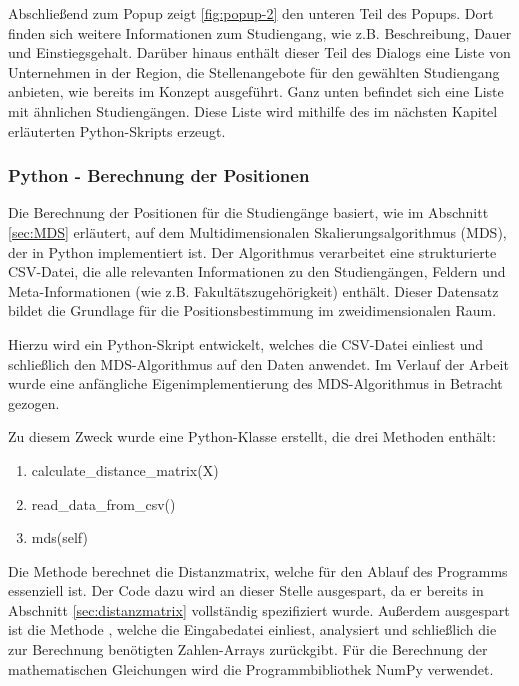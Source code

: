 Abschließend zum Popup zeigt \autoref{fig:popup-2} den unteren Teil des Popups. Dort finden sich weitere Informationen zum Studiengang, wie z.B. Beschreibung, Dauer und Einstiegsgehalt. Darüber hinaus enthält dieser Teil des Dialogs eine Liste von Unternehmen in der Region, die Stellenangebote für den gewählten Studiengang anbieten, wie bereits im Konzept ausgeführt. Ganz unten befindet sich eine Liste mit ähnlichen Studiengängen. Diese Liste wird mithilfe des im nächsten Kapitel erläuterten Python-Skripts erzeugt.

\subsubsection{Python - Berechnung der Positionen}
Die Berechnung der Positionen für die Studiengänge basiert, wie im Abschnitt
\ref{sec:MDS} erläutert, auf dem Multidimensionalen Skalierungsalgorithmus
(MDS), der in Python implementiert ist. Der Algorithmus verarbeitet eine
strukturierte CSV-Datei, die alle relevanten Informationen zu den Studiengängen,
Feldern und Meta-Informationen (wie z.B. Fakultätszugehörigkeit) enthält. Dieser
Datensatz bildet die Grundlage für die Positionsbestimmung im zweidimensionalen
Raum.

Hierzu wird ein Python-Skript entwickelt, welches die CSV-Datei einliest und
schließlich den MDS-Algorithmus auf den Daten anwendet. Im Verlauf der
Arbeit wurde eine anfängliche Eigenimplementierung des MDS-Algorithmus in
Betracht gezogen.

\noindent
Zu diesem Zweck wurde eine Python-Klasse erstellt, die drei Methoden enthält:
\begin{enumerate}
    \item calculate\_distance\_matrix(X)
    \item read\_data\_from\_csv()
    \item mds(self)
\end{enumerate}

Die Methode  berechnet die Distanzmatrix,
welche für den Ablauf des Programms essenziell ist. Der Code dazu wird an
dieser Stelle ausgespart, da er bereits in Abschnitt \ref{sec:distanzmatrix}
vollständig spezifiziert wurde. Außerdem ausgespart ist die Methode
, welche die Eingabedatei einliest, analysiert und
schließlich die zur Berechnung benötigten Zahlen-Arrays zurückgibt. Für die Berechnung der mathematischen Gleichungen wird die Programmbibliothek NumPy verwendet. \parencite{team_numpy_2023}


